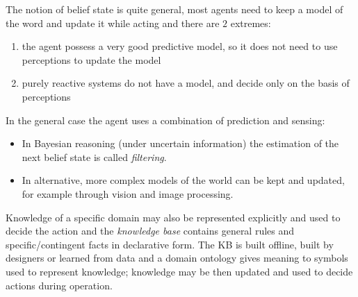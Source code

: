 The notion of belief state is quite general, most agents need to keep a model of the word and update it while acting
and there are $2$ extremes:
\begin{enumerate}
    \item the agent possess a very good predictive model, so it does not need to use perceptions to update the model
    \item purely reactive systems do not have a model, and decide only on the basis of perceptions
\end{enumerate}
In the general case the agent uses a combination of prediction and sensing:
\begin{itemize}
    \item In Bayesian reasoning (under uncertain information) the estimation
          of the next belief state is called \emph{filtering}.
    \item In alternative, more complex models of the world can be kept and updated, for
          example through vision and image processing.
\end{itemize}
Knowledge of a specific domain may also be represented explicitly and used to decide the action and 
the \emph{knowledge base} contains general rules and specific/contingent facts in declarative form.\newline
The KB is built offline, built by designers or learned from data and a domain ontology gives meaning
to symbols used to represent knowledge; knowledge may be then updated and used to decide actions during
operation.






